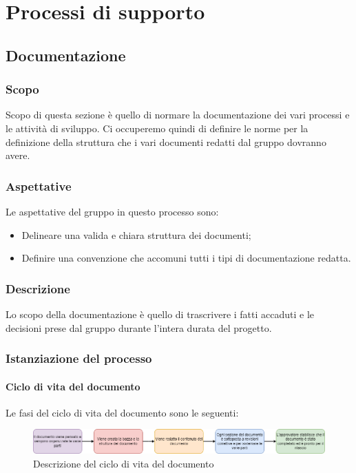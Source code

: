 \section{Processi di supporto}\label{section:processi_supporto}
\subsection{Documentazione}\label{subsection: documentazione}
\subsubsection{Scopo}\label{subsubsection: scopo}
Scopo di questa sezione è quello di normare la documentazione dei vari processi e le attività di sviluppo.
Ci occuperemo quindi di definire le norme per la definizione della struttura che i vari documenti redatti dal gruppo \groupName{} dovranno avere.
\subsubsection{Aspettative}
Le aspettative del gruppo \groupName{} in questo processo sono:
\begin{itemize}
\item Delineare una valida e chiara struttura dei documenti;
\item Definire una convenzione che accomuni tutti i tipi di documentazione redatta.
\end {itemize}
\subsubsection{Descrizione}
Lo scopo della documentazione è quello di trascrivere i fatti accaduti e le decisioni prese dal gruppo durante l'intera durata del progetto.
\subsubsection{Istanziazione del processo}
\paragraph{Ciclo di vita del documento}
Le fasi del ciclo di vita\glo{} del documento sono le seguenti:
\begin{figure}[htbp]
\centering
\includegraphics[scale = 0.5]{../template/images/NdP/CicloDiVitaDocumento.png}
\caption{Descrizione del ciclo di vita del documento}
\end {figure}
